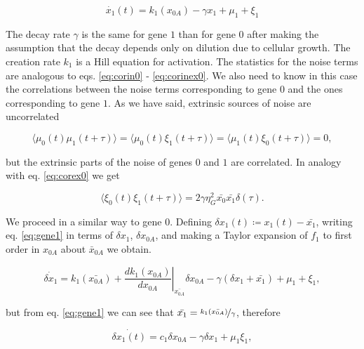 \begin{equation}
\label{eq:gene1}
\dot{x_1}(t) = k_1(x_{0A})-\gamma x_1+\mu_1+\xi_1
\end{equation}

The decay rate $\gamma$ is the same for gene $1$ than for gene $0$ after making the assumption that the decay depends only on dilution due to cellular growth. The creation rate $k_1$ is a Hill equation for activation. The statistics for the noise terms are analogous to eqs. \eqref{eq:corin0} - \eqref{eq:corinex0}. We also need to know in this case the correlations between the noise terms corresponding to gene $0$ and the ones corresponding to gene $1$. As we have said, extrinsic sources of noise are uncorrelated


\begin{equation}
\label{eq:corcross01}
\langle\mu_0(t)\mu_1(t+\tau)\rangle = \langle\mu_0(t)\xi_1(t+\tau)\rangle = \langle\mu_1(t)\xi_0(t+\tau)\rangle = 0,
\end{equation}

but the extrinsic parts of the noise of genes $0$ and $1$ are correlated. In analogy with eq. \eqref{eq:corex0} we get

\begin{equation}
  \langle\xi_0(t)\xi_1(t+\tau)\rangle = 2\gamma\eta_G^2\bar{x_0}\bar{x_1}\delta(\tau).
\end{equation}


We proceed in a similar way to gene $0$. Defining $\delta x_1(t) \coloneqq x_1(t) - \bar{x_1}$, writing eq. \eqref{eq:gene1} in terms of $\delta x_1$, $\delta x_{0A}$, and making a Taylor expansion of $f_1$ to first order in $x_{0A}$ about $\bar{x}_{0A}$ we obtain.

\begin{equation}
\dot{\delta x_1} = k_1(\bar{x_{0A}}) + \left.\frac{dk_1(x_{0A})}{dx_{0A}}\right|_{\bar{x_{0A}}}\delta x_{0A} - \gamma(\delta x_1 + \bar{x_1}) + \mu_1 + \xi_1,
\end{equation}

but from eq. \eqref{eq:gene1} we can see that $\bar{x_1} = \nicefrac{k_1(\bar{x_{0A}})}{\gamma}$, therefore

\begin{equation}
  \label{eq:dgene1}
  \dot{\delta{x_1}(t)}=c_1\delta x_{0A}-\gamma\delta x_1 + \mu_1 \xi_1,
\end{equation}

